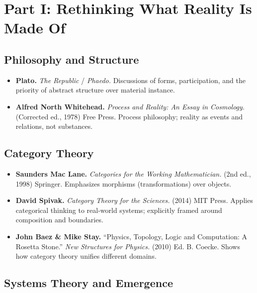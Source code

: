 \documentclass[
  openright]{book}
\begin{document}
\section{Part I: Rethinking What Reality Is Made
Of}\label{part-i-rethinking-what-reality-is-made-of}

\subsection{Philosophy and Structure}\label{philosophy-and-structure}

\begin{itemize}
\item
  \textbf{Plato.} \emph{The Republic} / \emph{Phaedo.} Discussions of
  forms, participation, and the priority of abstract structure over
  material instance.
\item
  \textbf{Alfred North Whitehead.} \emph{Process and Reality: An Essay
  in Cosmology.} (Corrected ed., 1978) Free Press. Process philosophy;
  reality as events and relations, not substances.
\end{itemize}

\subsection{Category Theory}\label{category-theory}

\begin{itemize}
\item
  \textbf{Saunders Mac Lane.} \emph{Categories for the Working
  Mathematician.} (2nd ed., 1998) Springer. Emphasizes morphisms
  (transformations) over objects.
\item
  \textbf{David Spivak.} \emph{Category Theory for the Sciences.} (2014)
  MIT Press. Applies categorical thinking to real-world systems;
  explicitly framed around composition and boundaries.
\item
  \textbf{John Baez \& Mike Stay.} ``Physics, Topology, Logic and
  Computation: A Rosetta Stone.'' \emph{New Structures for Physics.}
  (2010) Ed. B. Coecke. Shows how category theory unifies different
  domains.
\end{itemize}

\subsection{Systems Theory and
Emergence}\label{systems-theory-and-emergence}
\end{document}
